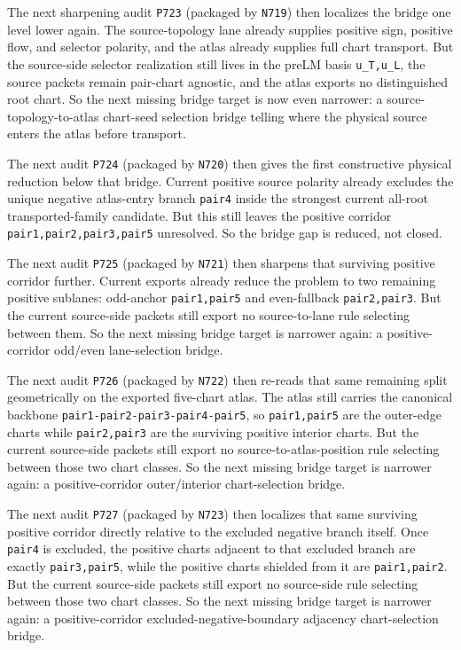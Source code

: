 \documentclass[11pt,a4paper]{article}
\begin{document}
The next sharpening audit \texttt{P723} (packaged by \texttt{N719}) then localizes the bridge one level lower again. The source-topology
lane already supplies positive sign, positive flow, and selector polarity, and the atlas already supplies full chart transport. But the
source-side selector realization still lives in the preLM basis \texttt{u\_T,u\_L}, the source packets remain pair-chart agnostic, and
the atlas exports no distinguished root chart. So the next missing bridge target is now even narrower: a source-topology-to-atlas
chart-seed selection bridge telling where the physical source enters the atlas before transport.

The next audit \texttt{P724} (packaged by \texttt{N720}) then gives the first constructive physical reduction below that bridge.
Current positive source polarity already excludes the unique negative atlas-entry branch \texttt{pair4} inside the strongest current
all-root transported-family candidate. But this still leaves the positive corridor
\texttt{pair1,pair2,pair3,pair5} unresolved. So the bridge gap is reduced, not closed.

The next audit \texttt{P725} (packaged by \texttt{N721}) then sharpens that surviving positive corridor further.
Current exports already reduce the problem to two remaining positive sublanes:
odd-anchor \texttt{pair1,pair5} and even-fallback \texttt{pair2,pair3}.
But the current source-side packets still export no source-to-lane rule selecting between them.
So the next missing bridge target is narrower again: a positive-corridor odd/even lane-selection bridge.

The next audit \texttt{P726} (packaged by \texttt{N722}) then re-reads that same remaining split geometrically on the exported
five-chart atlas. The atlas still carries the canonical backbone \texttt{pair1-pair2-pair3-pair4-pair5}, so
\texttt{pair1,pair5} are the outer-edge charts while \texttt{pair2,pair3} are the surviving positive interior charts.
But the current source-side packets still export no source-to-atlas-position rule selecting between those two chart classes.
So the next missing bridge target is narrower again: a positive-corridor outer/interior chart-selection bridge.

The next audit \texttt{P727} (packaged by \texttt{N723}) then localizes that same surviving positive corridor directly relative to
the excluded negative branch itself. Once \texttt{pair4} is excluded, the positive charts adjacent to that excluded branch are
exactly \texttt{pair3,pair5}, while the positive charts shielded from it are \texttt{pair1,pair2}.
But the current source-side packets still export no source-side rule selecting between those two chart classes.
So the next missing bridge target is narrower again: a positive-corridor excluded-negative-boundary adjacency chart-selection bridge.
\end{document}

